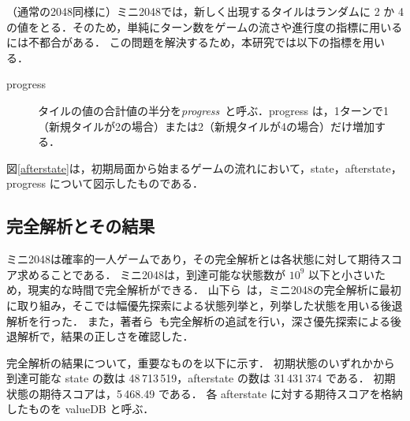（通常の2048同様に）ミニ2048では，新しく出現するタイルはランダムに 2 か 4 の値をとる．そのため，単純にターン数をゲームの流さや進行度の指標に用いるには不都合がある．
この問題を解決するため，本研究では以下の指標を用いる．
\begin{description}
 \item[progress] タイルの値の合計値の半分を\emph{progress}~\cite{TeKM23}と呼ぶ．progress は，1ターンで1（新規タイルが2の場合）または2（新規タイルが4の場合）だけ増加する．
\end{description}

図\ref{afterstate}は，初期局面から始まるゲームの流れにおいて，state，afterstate，progress について図示したものである．


\subsection{完全解析とその結果}

ミニ2048は確率的一人ゲームであり，その完全解析とは各状態に対して期待スコア求めることである．
ミニ2048は，到達可能な状態数が $10^9$ 以下と小さいため，現実的な時間で完全解析ができる．
山下ら~\cite{YaKN22J}は，ミニ2048の完全解析に最初に取り組み，そこでは幅優先探索による状態列挙と，列挙した状態を用いる後退解析を行った．
また，著者ら~\cite{TeKM23}も完全解析の追試を行い，深さ優先探索による後退解析で，結果の正しさを確認した．

完全解析の結果について，重要なものを以下に示す．
初期状態のいずれかから到達可能な state の数は 48\,713\,519，afterstate の数は 31\,431\,374 である．
初期状態の期待スコアは，5\,468.49 である．
各 afterstate に対する期待スコアを格納したものを valueDB と呼ぶ．

